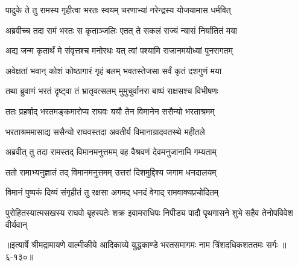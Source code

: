 \twolineshloka
{पादुके ते तु रामस्य गृहीत्वा भरतः स्वयम्}
{चरणाभ्यां नरेन्द्रस्य योजयामास धर्मवित्} %

\twolineshloka
{अब्रवीच्च तदा रामं भरतः स कृताञ्जलिः}
{एतत् ते सकलं राज्यं न्यासं निर्यातितं मया} %

\twolineshloka
{अद्य जन्म कृतार्थं मे संवृत्तश्च मनोरथः}
{यत् त्वां पश्यामि राजानमयोध्यां पुनरागतम्} %

\twolineshloka
{अवेक्षतां भवान् कोशं कोष्ठागारं गृहं बलम्}
{भवतस्तेजसा सर्वं कृतं दशगुणं मया} %

\twolineshloka
{तथा ब्रुवाणं भरतं दृष्ट्वा तं भ्रातृवत्सलम्}
{मुमुचुर्वानरा बाष्पं राक्षसश्च विभीषणः} %

\twolineshloka
{ततः प्रहर्षाद् भरतमङ्कमारोप्य राघवः}
{ययौ तेन विमानेन ससैन्यो भरताश्रमम्} %

\twolineshloka
{भरताश्रममासाद्य ससैन्यो राघवस्तदा}
{अवतीर्य विमानाग्रादवतस्थे महीतले} %

\twolineshloka
{अब्रवीत् तु तदा रामस्तद् विमानमनुत्तमम्}
{वह वैश्रवणं देवमनुजानामि गम्यताम्} %

\twolineshloka
{ततो रामाभ्यनुज्ञातं तद् विमानमनुत्तमम्}
{उत्तरां दिशमुद्दिश्य जगाम धनदालयम्} %

\twolineshloka
{विमानं पुष्पकं दिव्यं संगृहीतं तु रक्षसा}
{अगमद् धनदं वेगाद् रामवाक्यप्रचोदितम्} %

\twolineshloka
{पुरोहितस्यात्मसखस्य राघवो बृहस्पतेः शक्र इवामराधिपः}
{निपीड्य पादौ पृथगासने शुभे सहैव तेनोपविवेश वीर्यवान्} %


॥इत्यार्षे श्रीमद्रामायणे वाल्मीकीये आदिकाव्ये युद्धकाण्डे भरतसमागमः नाम त्रिंशदधिकशततमः सर्गः ॥६-१३०॥
